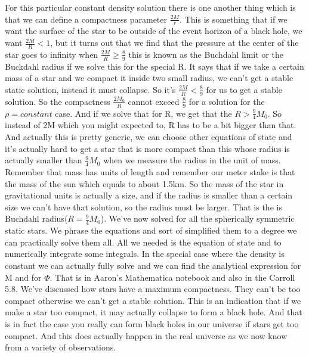 \documentclass[10pt]{article}
\begin{document}
\newline\newline
For this particular constant density solution there is one another thing which is that we can define a compactness parameter $\frac{2M}{r}$. This is something that if we want the surface of the star to be outside of the event horizon of a black hole, we want $\frac{2M}{R}<1$, but it turns out that we find that the pressure at the center of the star goes to infinity when $\frac{2M}{R}\geq \frac{8}{9}$ this is known as the Buchdahl limit or the Buckdahl radius if we solve this for the special R. It says that if we take a certain mass of a star and we compact it inside two small radius, we can't get a stable static solution, instead it must collapse. So it's $\frac{2M}{R}< \frac{8}{9}$ for us to get a stable solution. So the compactness $\frac{2M_0}{R}$ cannot exceed $\frac{8}{9}$ for a solution for the $\rho=constant$ case. And if we solve that for R, we get that the $R>\frac{9}{4}M_0$. So instead of 2M which you might expected to, R has to be a bit bigger than that. And actually this is pretty generic, we can choose other equations of state and it's actually hard to get a star that is more compact than this whose radius is actually smaller than $\frac{9}{4}M_0$ when we measure the radius in the unit of mass. Remember that mass has units of length and remember our meter stake is that the mass of the sun which equals to about 1.5km. So the mass of the star in gravitational units is actually a size, and if the radius is smaller than a certain size we can't have that solution, so the radius must be larger. That is the is Buchdahl radius($R=\frac{9}{4}M_0$). 
\newline\newline
We've now solved for all the spherically symmetric static stars. We phrase the equations and sort of simplified them to a degree we can practically solve them all. All we needed is the equation of state and to numerically integrate some integrals. In the special case where the density is constant we can actually fully solve and we can find the analytical expression for M and for $\Phi$. That is in Aaron's Mathematica notebook and also in the Carroll 5.8. We've discussed how stars have a maximum compactness. They can't be too compact otherwise we can't get a stable solution. This is an indication that if we make a star too compact, it may actually collapse to form a black hole. And that is in fact the case you really can form black holes in our universe if stars get too compact. And this does actually happen in the real universe as we now know from a variety of observations.



                    					
\end{document}
